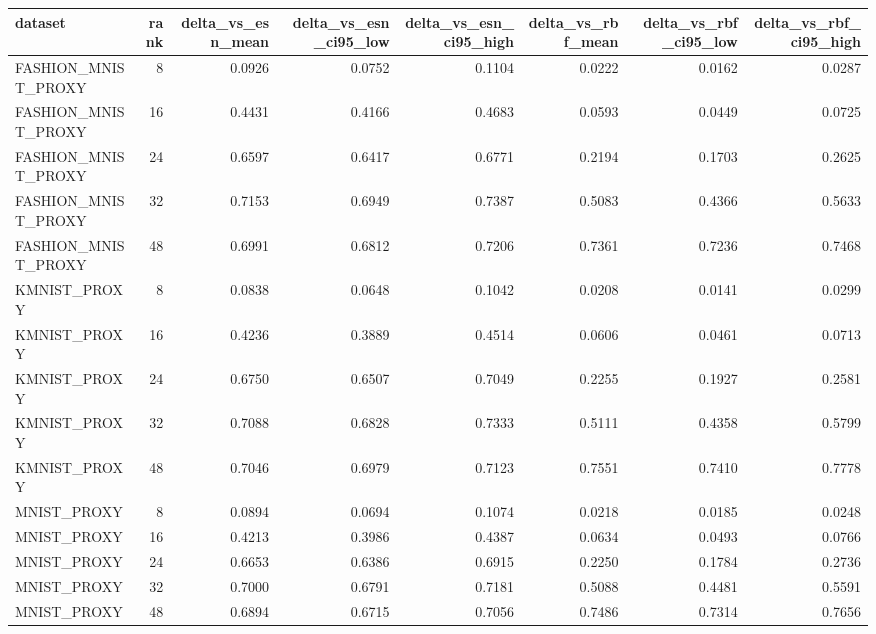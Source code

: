 \begin{tabular}{lrrrrrrr}
\toprule
dataset & rank & delta\_vs\_esn\_mean & delta\_vs\_esn\_ci95\_low & delta\_vs\_esn\_ci95\_high & delta\_vs\_rbf\_mean & delta\_vs\_rbf\_ci95\_low & delta\_vs\_rbf\_ci95\_high \\
\midrule
FASHION\_MNIST\_PROXY & 8 & 0.0926 & 0.0752 & 0.1104 & 0.0222 & 0.0162 & 0.0287 \\
FASHION\_MNIST\_PROXY & 16 & 0.4431 & 0.4166 & 0.4683 & 0.0593 & 0.0449 & 0.0725 \\
FASHION\_MNIST\_PROXY & 24 & 0.6597 & 0.6417 & 0.6771 & 0.2194 & 0.1703 & 0.2625 \\
FASHION\_MNIST\_PROXY & 32 & 0.7153 & 0.6949 & 0.7387 & 0.5083 & 0.4366 & 0.5633 \\
FASHION\_MNIST\_PROXY & 48 & 0.6991 & 0.6812 & 0.7206 & 0.7361 & 0.7236 & 0.7468 \\
KMNIST\_PROXY & 8 & 0.0838 & 0.0648 & 0.1042 & 0.0208 & 0.0141 & 0.0299 \\
KMNIST\_PROXY & 16 & 0.4236 & 0.3889 & 0.4514 & 0.0606 & 0.0461 & 0.0713 \\
KMNIST\_PROXY & 24 & 0.6750 & 0.6507 & 0.7049 & 0.2255 & 0.1927 & 0.2581 \\
KMNIST\_PROXY & 32 & 0.7088 & 0.6828 & 0.7333 & 0.5111 & 0.4358 & 0.5799 \\
KMNIST\_PROXY & 48 & 0.7046 & 0.6979 & 0.7123 & 0.7551 & 0.7410 & 0.7778 \\
MNIST\_PROXY & 8 & 0.0894 & 0.0694 & 0.1074 & 0.0218 & 0.0185 & 0.0248 \\
MNIST\_PROXY & 16 & 0.4213 & 0.3986 & 0.4387 & 0.0634 & 0.0493 & 0.0766 \\
MNIST\_PROXY & 24 & 0.6653 & 0.6386 & 0.6915 & 0.2250 & 0.1784 & 0.2736 \\
MNIST\_PROXY & 32 & 0.7000 & 0.6791 & 0.7181 & 0.5088 & 0.4481 & 0.5591 \\
MNIST\_PROXY & 48 & 0.6894 & 0.6715 & 0.7056 & 0.7486 & 0.7314 & 0.7656 \\
\bottomrule
\end{tabular}

